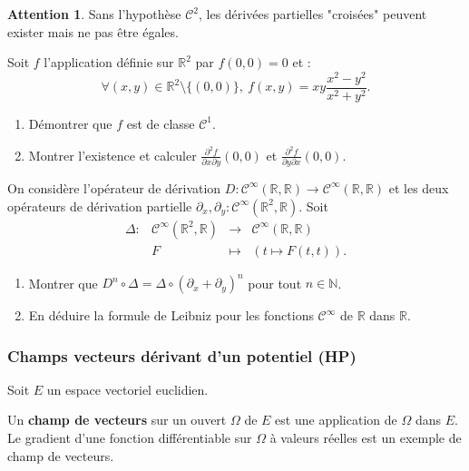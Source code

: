\documentclass[french]{article}
\newcommand{\N}{\mathbb{N}}
\newcommand{\R}{\mathbb{R}}
\theoremstyle{plain}
\theoremstyle{definition}
\newtheorem*{attention}{Attention}
\theoremstyle{remark}
\begin{document}
\begin{attention}
	Sans l'hypothèse $\mathcal{C}^2$, les dérivées partielles "croisées" peuvent exister mais ne pas être égales.
\end{attention}

\begin{exo}
	Soit $f$ l'application définie sur $\R^2$ par $f(0,0)=0$ et :
	$$\forall (x,y)\in\R^2\setminus\{(0,0)\},\ f(x,y)=xy\frac{x^2-y^2}{x^2+y^2}.$$
	\begin{enumerate}
		\item Démontrer que $f$ est de classe $\mathcal{C}^1$.
		\item Montrer l'existence et calculer $\displaystyle\frac{\partial^2f}{\partial x\partial y}(0,0)$ et $\displaystyle\frac{\partial^2f}{\partial y\partial x}(0,0)$.
	\end{enumerate}
\end{exo}

\begin{exo}
	On considère l'opérateur de dérivation $D:\mathcal{C}^\infty(\R,\R)\to\mathcal{C}^\infty(\R,\R)$ et les deux opérateurs de dérivation partielle $\partial_x,\partial_y:\mathcal{C}^\infty(\R^2,\R)$. Soit 
	$$\begin{array}{lrcl}
		\Delta:&\mathcal{C}^\infty(\R^2,\R)&\longrightarrow&\mathcal{C}^\infty(\R,\R)\\
		&F&\longmapsto&(t\mapsto F(t,t)).
	\end{array}$$
	\begin{enumerate}
		\item Montrer que $D^n\circ\Delta=\Delta\circ(\partial_x+\partial_y)^n$ pour tout $n\in\N$.
		\item En déduire la formule de Leibniz pour les fonctions $\mathcal{C}^\infty$ de $\R$ dans $\R$.
	\end{enumerate}
\end{exo}

\subsubsection*{Champs vecteurs dérivant d'un potentiel (HP)}

Soit $E$ un espace vectoriel euclidien.

Un \textbf{champ de vecteurs} sur un ouvert $\Omega$ de $E$ est une application de $\Omega$ dans $E$. Le gradient d'une fonction différentiable sur $\Omega$ à valeurs réelles est un exemple de champ de vecteurs.
\end{document}
